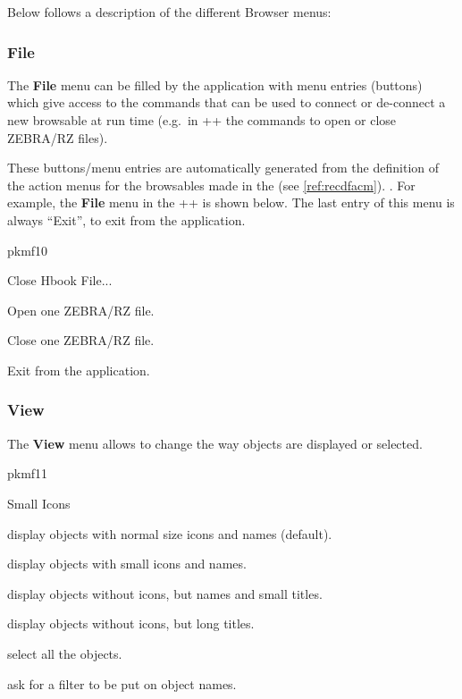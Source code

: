 Below follows a description of the different Browser menus:

\subsubsection*{File}

The \textbf{File} menu can be filled by the application with menu
entries (buttons)  
which give access to the commands that can be used to connect or de-connect 
a new browsable at run time (e.g.\ in \PAW++{} the commands to open or close 
ZEBRA/RZ files).

These buttons/menu entries are automatically generated from the
definition of the action menus for the browsables made in the 
\ifKUIPman
  \CDF{} (see \ref{ref:recdfacm}).
\else
  \CDF{}.
\fi
For example, the \textbf{File} menu in the \PAW++{} \MB{} is shown below.
The last entry of this menu is always ``Exit'', to exit from the 
application.

\begin{PICTf}[.25] {pkmf10}
\begin{DLsf}{Close Hbook File...}
\item[Open Hbook File...]
          Open one ZEBRA/RZ file. 
\item[Close Hbook File...]
          Close one ZEBRA/RZ file.
\item[Exit]
          Exit from the application.
\end{DLsf}
\end{PICTf}

\subsubsection*{View}

The \textbf{View} menu allows to change the way objects are displayed
or selected. 
\vspace{.5\baselineskip}

\begin{PICTf}[.17]{pkmf11}
\begin{DLsf}{Small Icons}
\item[Icons]
         display objects with normal size icons and names (default). 
\item[Small Icons]
         display objects with small icons and names.
\item[No Icons]
         display objects without icons, but names and small titles.
\item[Titles]
         display objects without icons, but long titles.
\item[Select All]
         select all the objects.
\item[Filter...]
         ask for a filter to be put on object names.
\end{DLsf}
\end{PICTf}

